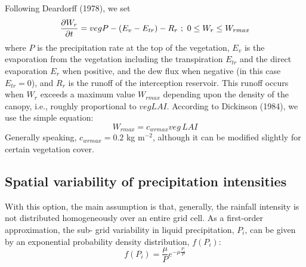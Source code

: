 Following Deardorff (1978), we set
\begin{eqnarray}
{\partial W_r \over \partial t} = veg P - (E_v-E_{tr}) - R_r \ ; \
0 \leq W_r \leq W_{rmax}
\end{eqnarray}
where $P$ is the precipitation rate at the top of the vegetation,
$E_v$ is the evaporation from the vegetation including the
transpiration $E_{tr}$ and the direct evaporation $E_r$ when
positive, and the dew flux when negative (in this case $E_{tr} = 0$),
and $R_r$ is the runoff of the interception reservoir.
This runoff occurs when $W_r$ exceeds a maximum value $W_{rmax}$
depending upon the density of the canopy, i.e., roughly proportional
to $veg LAI$.
According to Dickinson (1984), we use the simple equation:
%
\begin{equation}
\label{eq:isba_max_int_res_cap}
W_{rmax} = c_{wrmax} veg \, LAI 
\end{equation}
%
Generally speaking, $c_{wrmax}=0.2$ kg m$^{-2}$, although it
can be modified slightly for certain 
vegetation cover.

\subsection{Spatial variability of precipitation intensities}
\label{sec:isba_runoff_var_precip}

With this option, the main assumption is that, generally, the rainfall intensity is not 
distributed homogeneously over an entire grid cell. As a first-order approximation, the sub-
grid variability in liquid precipitation, $P_i$, can be given by an exponential probability density 
distribution, $f(P_i)$:
     \begin{equation}
      	f(P_i) = \frac{\mu}{P} e^{-\mu\frac{P_i}{P}} 
     \end{equation}

